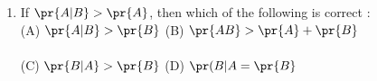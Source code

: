 \begin{enumerate}[label=\thechapter.\arabic*,ref=\thechapter.\theenumi]
\item If $\pr{A|B}>\pr{A}$, then which of the following is correct :\\
(A) $\pr{A|B}>\pr{B}$ (B) $\pr{AB}>\pr{A}+\pr{B}$\\
\\
(C) $\pr{B|A}>\pr{B}$ (D) $\pr({B|A} = \pr{B}$\\
\end{enumerate}
